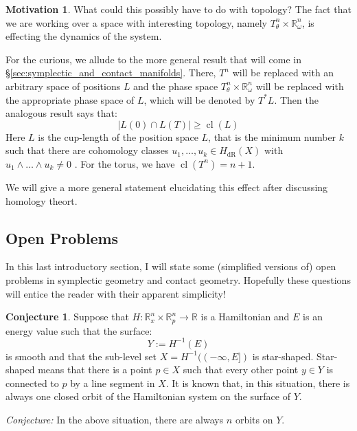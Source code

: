 \documentclass[12pt]{article}
\theoremstyle{definition}
\newtheorem{motivation}[theorem]{Motivation}
\numberwithin{equation}{section}
\newtheorem{conjecture}[theorem]{Conjecture}
\newcommand{\R}{{\mathbb R}}
\newcommand{\op}{\operatorname}
\begin{document}
\begin{motivation} What could this possibly have to do with topology? The fact that we are working over a space with interesting topology, namely $T^n_\theta \times \R^n_\omega$, is effecting the dynamics of the system. 

For the curious, we allude to the more general result that will come in \S \ref{sec:symplectic_and_contact_manifolds}. There, $T^n$ will be replaced with an arbitrary space of positions $L$ and the phase space $T^n_\theta \times \R^n_\omega$ will be replaced with the appropriate phase space of $L$, which will be denoted by $T^*L$. Then the analogous result says that:
\[
|L(0) \cap L(T)| \ge \op{cl}(L)
\]
Here $L$ is the cup-length of the position space $L$, that is the minimum number $k$ such that there are cohomology classes $u_1,\dots,u_k \in H_{\op{dR}}(X)$ with $u_1 \wedge \dots \wedge u_k \neq 0$ . For the torus, we have $\op{cl}(T^n) = n+1$.

We will give a more general statement elucidating this effect after discussing homology theort. \end{motivation}

\subsection{Open Problems} In this last introductory section, I will state some (simplified versions of) open problems in symplectic geometry and contact geometry. Hopefully these questions will entice the reader with their apparent simplicity!

\begin{conjecture} Suppose that $H:\R^n_x \times \R^n_p \to \R$ is a Hamiltonian and $E$ is an energy value such that the surface:
\[
Y := H^{-1}(E)
\]
is smooth and that the sub-level set $X = H^{-1}((-\infty,E])$ is star-shaped. Star-shaped means that there is a point $p \in X$ such that every other point $y \in Y$ is connected to $p$ by a line segment in $X$. It is known that, in this situation, there is always one closed orbit of the Hamiltonian system on the surface of $Y$.

\emph{Conjecture:} In the above situation, there are always $n$ orbits on $Y$.
\end{conjecture}
\end{document}
